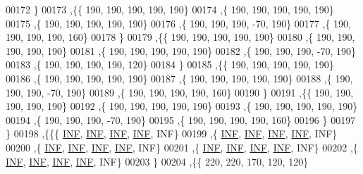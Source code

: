 \begin{DoxyCode}
00172   \}
00173  ,\{\{   190,   190,   190,   190,   190\}
00174   ,\{   190,   190,   190,   190,   190\}
00175   ,\{   190,   190,   190,   190,   190\}
00176   ,\{   190,   190,   190,   -70,   190\}
00177   ,\{   190,   190,   190,   190,   160\}
00178   \}
00179  ,\{\{   190,   190,   190,   190,   190\}
00180   ,\{   190,   190,   190,   190,   190\}
00181   ,\{   190,   190,   190,   190,   190\}
00182   ,\{   190,   190,   190,   -70,   190\}
00183   ,\{   190,   190,   190,   190,   120\}
00184   \}
00185  ,\{\{   190,   190,   190,   190,   190\}
00186   ,\{   190,   190,   190,   190,   190\}
00187   ,\{   190,   190,   190,   190,   190\}
00188   ,\{   190,   190,   190,   -70,   190\}
00189   ,\{   190,   190,   190,   190,   160\}
00190   \}
00191  ,\{\{   190,   190,   190,   190,   190\}
00192   ,\{   190,   190,   190,   190,   190\}
00193   ,\{   190,   190,   190,   190,   190\}
00194   ,\{   190,   190,   190,   -70,   190\}
00195   ,\{   190,   190,   190,   190,   160\}
00196   \}
00197  \}
00198 ,\{\{\{   \hyperlink{energy__const_8h_a12c2040f25d8e3a7b9e1c2024c618cb6}{INF},   \hyperlink{energy__const_8h_a12c2040f25d8e3a7b9e1c2024c618cb6}{INF},   \hyperlink{energy__const_8h_a12c2040f25d8e3a7b9e1c2024c618cb6}{INF},   \hyperlink{energy__const_8h_a12c2040f25d8e3a7b9e1c2024c618cb6}{INF},   INF\}
00199   ,\{   \hyperlink{energy__const_8h_a12c2040f25d8e3a7b9e1c2024c618cb6}{INF},   \hyperlink{energy__const_8h_a12c2040f25d8e3a7b9e1c2024c618cb6}{INF},   \hyperlink{energy__const_8h_a12c2040f25d8e3a7b9e1c2024c618cb6}{INF},   \hyperlink{energy__const_8h_a12c2040f25d8e3a7b9e1c2024c618cb6}{INF},   INF\}
00200   ,\{   \hyperlink{energy__const_8h_a12c2040f25d8e3a7b9e1c2024c618cb6}{INF},   \hyperlink{energy__const_8h_a12c2040f25d8e3a7b9e1c2024c618cb6}{INF},   \hyperlink{energy__const_8h_a12c2040f25d8e3a7b9e1c2024c618cb6}{INF},   \hyperlink{energy__const_8h_a12c2040f25d8e3a7b9e1c2024c618cb6}{INF},   INF\}
00201   ,\{   \hyperlink{energy__const_8h_a12c2040f25d8e3a7b9e1c2024c618cb6}{INF},   \hyperlink{energy__const_8h_a12c2040f25d8e3a7b9e1c2024c618cb6}{INF},   \hyperlink{energy__const_8h_a12c2040f25d8e3a7b9e1c2024c618cb6}{INF},   \hyperlink{energy__const_8h_a12c2040f25d8e3a7b9e1c2024c618cb6}{INF},   INF\}
00202   ,\{   \hyperlink{energy__const_8h_a12c2040f25d8e3a7b9e1c2024c618cb6}{INF},   \hyperlink{energy__const_8h_a12c2040f25d8e3a7b9e1c2024c618cb6}{INF},   \hyperlink{energy__const_8h_a12c2040f25d8e3a7b9e1c2024c618cb6}{INF},   \hyperlink{energy__const_8h_a12c2040f25d8e3a7b9e1c2024c618cb6}{INF},   INF\}
00203   \}
00204  ,\{\{   220,   220,   170,   120,   120\}

\end{DoxyCode}
